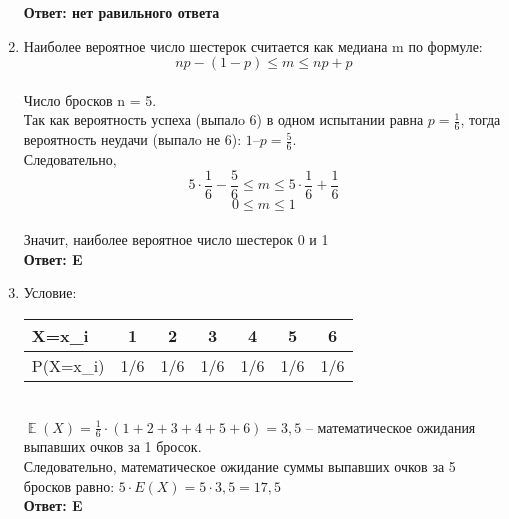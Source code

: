 \documentclass[112pt, cmcyralt]{article}
\DeclareMathOperator{\E}{\mathbb{E}}
\begin{document}
\begin{enumerate}
\textbf{Ответ: нет равильного ответа}

\item
Наиболее вероятное число шестерок считается как медиана m по формуле:\\
$$np - (1-p) \leqslant m \leqslant np + p$$\\
Число бросков n = 5.\\
Так как вероятность успеха (выпалo 6) в одном испытании равна $p = \frac{1}{6}$, тогда вероятность неудачи (выпалo не 6): $1 $–$ p = \frac{5}{6}$.\\
Следовательно, $$5\cdot\frac{1}{6} - \frac{5}{6} \leqslant m \leqslant 5\cdot \frac{1}{6} + \frac{1}{6}$$
$$ 0 \leqslant m \leqslant 1 $$\\
Значит, наиболее вероятное число шестерок 0 и 1\\
\textbf{Ответ: E}

\item Условие:

\begin{center}
\begin{tabular}{lcccccc}
\hline
X=x_i      & 1  & 2  & 3 & 4 & 5 & 6  \\ \hline
P(X=x_i) &1/6 &1/6 &1/6 &1/6 &1/6 &1/6 \\ \hline
\end{tabular}
\end{center}\\
$\E(X) = \frac{1}{6}\cdot(1 + 2 + 3 + 4 + 5 + 6) = 3,5$ – математическое ожидания выпавших очков за 1 бросок.\\

Следовательно, математическое ожидание суммы выпавших очков за 5 бросков равно: 
$5\cdot E(X) = 5\cdot3,5 = 17,5$\\

\textbf{Ответ: E}


\end{enumerate}
\end{document}
